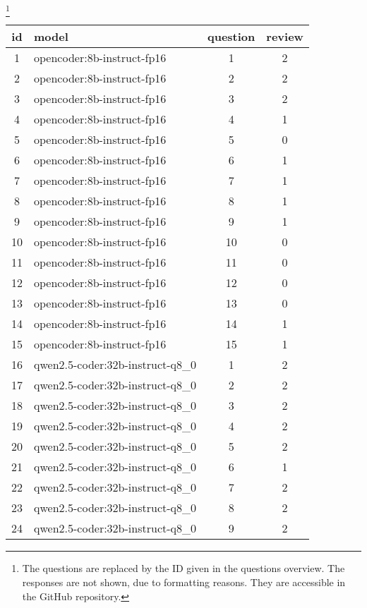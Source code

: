 \footnote{The questions are replaced by the ID given in the questions overview. The responses are not shown, due to formatting reasons. They are accessible in the GitHub repository.} 
\begin{longtable}{|c|p{7cm}|c|c|}
\toprule
id & model & question & review \\
\midrule
1 & opencoder:8b-instruct-fp16 & 1 & 2 \\
2 & opencoder:8b-instruct-fp16 & 2 & 2 \\
3 & opencoder:8b-instruct-fp16 & 3 & 2 \\
4 & opencoder:8b-instruct-fp16 & 4 & 1 \\
5 & opencoder:8b-instruct-fp16 & 5 & 0 \\
6 & opencoder:8b-instruct-fp16 & 6 & 1 \\
7 & opencoder:8b-instruct-fp16 & 7 & 1 \\
8 & opencoder:8b-instruct-fp16 & 8 & 1 \\
9 & opencoder:8b-instruct-fp16 & 9 & 1 \\
10 & opencoder:8b-instruct-fp16 & 10 & 0 \\
11 & opencoder:8b-instruct-fp16 & 11 & 0 \\
12 & opencoder:8b-instruct-fp16 & 12 & 0 \\
13 & opencoder:8b-instruct-fp16 & 13 & 0 \\
14 & opencoder:8b-instruct-fp16 & 14 & 1 \\
15 & opencoder:8b-instruct-fp16 & 15 & 1 \\
16 & qwen2.5-coder:32b-instruct-q8\_0 & 1 & 2 \\
17 & qwen2.5-coder:32b-instruct-q8\_0 & 2 & 2 \\
18 & qwen2.5-coder:32b-instruct-q8\_0 & 3 & 2 \\
19 & qwen2.5-coder:32b-instruct-q8\_0 & 4 & 2 \\
20 & qwen2.5-coder:32b-instruct-q8\_0 & 5 & 2 \\
21 & qwen2.5-coder:32b-instruct-q8\_0 & 6 & 1 \\
22 & qwen2.5-coder:32b-instruct-q8\_0 & 7 & 2 \\
23 & qwen2.5-coder:32b-instruct-q8\_0 & 8 & 2 \\
24 & qwen2.5-coder:32b-instruct-q8\_0 & 9 & 2 \\

\end{longtable}
